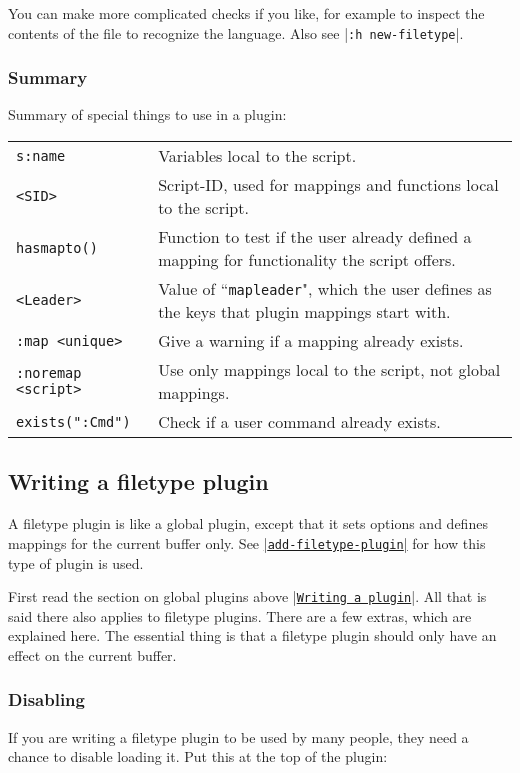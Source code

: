 You can make more complicated checks if you like, for example to inspect the contents of the file to recognize the language.
Also see |\texttt{:h new-filetype}|.
\subsubsection{Summary}
\label{plugin-special}

Summary of special things to use in a plugin:
\begin{center} \begin{tabular}{l l}
				\texttt{s:name} & Variables local to the script. \\
				\texttt{<SID>} & Script-ID, used for mappings and functions local to the script. \\
				\texttt{hasmapto()} & Function to test if the user already defined a mapping for functionality the script offers. \\
				\texttt{<Leader>} & Value of ``\texttt{mapleader}", which the user defines as the keys that plugin mappings start with. \\
				\texttt{:map <unique>} & Give a warning if a mapping already exists. \\
				\texttt{:noremap <script>} & Use only mappings local to the script, not global mappings. \\
				\texttt{exists(":Cmd")} & Check if a user command already exists. \\
\end{tabular} \end{center}
\subsection{Writing a filetype plugin}
\label{write-filetype-plugin}
\label{ftplugin}
A filetype plugin is like a global plugin, except that it sets options and defines mappings for the current buffer only.
See \hyperref[add-filetype-plugin]{|\texttt{add-filetype-plugin}|} for how this type of plugin is used.

First read the section on global plugins above |\hyperref[Writing a plugin]{\texttt{Writing a plugin}}|.
All that is said there also applies to filetype plugins.
There are a few extras, which are explained here.
The essential thing is that a filetype plugin should only have an effect on the current buffer.

\subsubsection{Disabling}
If you are writing a filetype plugin to be used by many people, they need a chance to disable loading it.
Put this at the top of the plugin:

